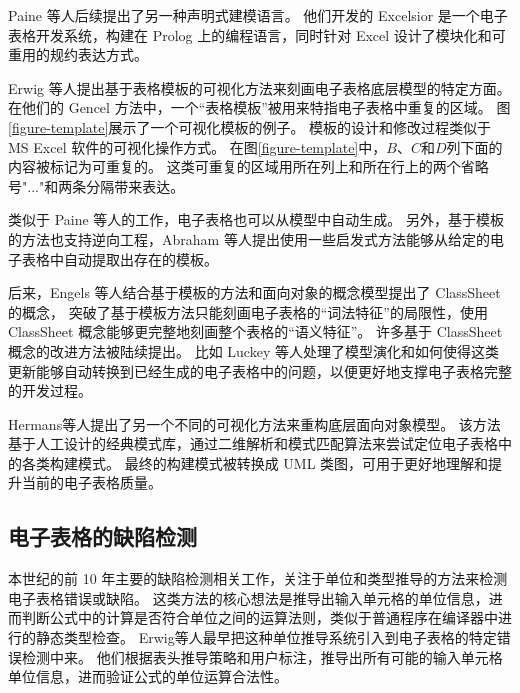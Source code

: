 Paine 等人\cite{paine2005bringing,paine2008rapid}后续提出了另一种声明式建模语言。
他们开发的 Excelsior 是一个电子表格开发系统，构建在 Prolog 上的编程语言，同时针对 Excel 设计了模块化和可重用的规约表达方式。


Erwig 等人\cite{erwig2004gencel,erwig2005automatic,abraham2005goal}提出基于表格模板的可视化方法来刻画电子表格底层模型的特定方面。
在他们的 Gencel 方法中，一个“表格模板”被用来特指电子表格中重复的区域。
图\ref{figure-template}展示了一个可视化模板的例子。
模板的设计和修改过程类似于 MS Excel 软件的可视化操作方式。
在图\ref{figure-template}中，$B$、$C$和$D$列下面的内容被标记为可重复的。
这类可重复的区域用所在列上和所在行上的两个省略号"..."和两条分隔带来表达。

类似于 Paine 等人的工作，电子表格也可以从模型中自动生成。
另外，基于模板的方法也支持逆向工程，Abraham 等人\cite{abraham2006inferring}提出使用一些启发式方法能够从给定的电子表格中自动提取出存在的模板。

后来，Engels 等人\cite{engels2005classsheets,cunha2010automatically}结合基于模板的方法和面向对象的概念模型提出了 ClassSheet 的概念，
突破了基于模板方法只能刻画电子表格的“词法特征”的局限性，使用 ClassSheet 概念能够更完整地刻画整个表格的“语义特征”。
许多基于 ClassSheet 概念的改进方法被陆续提出\cite{luckey2012systematic,cunha2011type,cunha2011embedding,cunha2012bidirectional}。
比如 Luckey 等人\cite{luckey2012systematic}处理了模型演化和如何使得这类更新能够自动转换到已经生成的电子表格中的问题，以便更好地支撑电子表格完整的开发过程。

Hermans等人\cite{hermans2010automatically}提出了另一个不同的可视化方法来重构底层面向对象模型。
该方法基于人工设计的经典模式库，通过二维解析和模式匹配算法来尝试定位电子表格中的各类构建模式。
最终的构建模式被转换成 UML 类图，可用于更好地理解和提升当前的电子表格质量。

\subsection{电子表格的缺陷检测}
本世纪的前 10 年主要的缺陷检测相关工作，关注于单位和类型推导的方法\cite{erwig2002adding,burnett2002testing,ahmad2003type,abraham2004header,abraham2006type,abraham2007ucheck,antoniu2004validating,chambers2009automatic,chambers2010reasoning}来检测电子表格错误或缺陷。
这类方法的核心想法是推导出输入单元格的单位信息，进而判断公式中的计算是否符合单位之间的运算法则，类似于普通程序在编译器中进行的静态类型检查。
Erwig等人\cite{erwig2002adding,abraham2004header}最早把这种单位推导系统引入到电子表格的特定错误检测中来。
他们根据表头推导策略和用户标注，推导出所有可能的输入单元格单位信息，进而验证公式的单位运算合法性。

